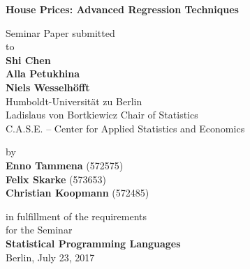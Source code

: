 \begin{center}

    {\Large{\bf House Prices: Advanced Regression Techniques}} \vspace{0.5cm}


    {\normalsize Seminar Paper submitted\\\vspace{0.5cm}
    to}\\\vspace{0.5cm}
    {\normalsize{\bf Shi Chen \\Alla Petukhina \\Niels Wesselhöfft}} \\\vspace{0.5cm}
    {\normalsize Humboldt-Universit\"at zu Berlin \\
    Ladislaus von Bortkiewicz Chair of Statistics \\
    C.A.S.E. – Center for Applied Statistics
and Economics} \vspace{1cm}


    {\normalsize by \\\vspace{0.5cm}
    {\bf Enno Tammena}
    (572575)}\\
    {\normalsize
    {\bf Felix Skarke}
    (573653)}\\
    {\normalsize
    {\bf Christian Koopmann}
    (572485)}\vspace{1cm}


    {\normalsize in fulfillment of the requirements  \\
    for the Seminar \\
    {\bf Statistical Programming Languages} \\
    Berlin, July 23, 2017}

\end{center}
